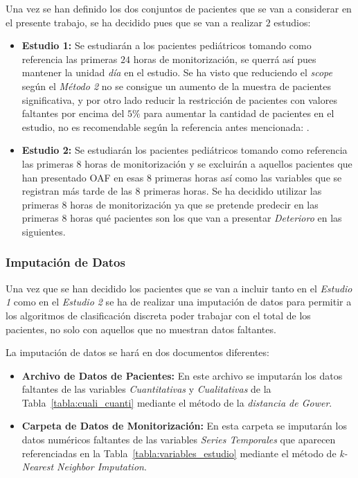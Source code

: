 Una vez se han definido los dos conjuntos de pacientes que se van a considerar en el presente trabajo, se ha decidido pues que se van a realizar $2$ estudios:

\begin{itemize}
    \item \textbf{Estudio 1:} Se estudiarán a los pacientes pediátricos tomando como referencia las primeras $24$ horas de monitorización, se querrá así pues mantener la unidad \textit{día} en el estudio. Se ha visto que reduciendo el \textit{scope} según el \textit{Método 2} no se consigue un aumento de la muestra de pacientes significativa, y por otro lado reducir la restricción de pacientes con valores faltantes por encima del $5\%$ para aumentar la cantidad de pacientes en el estudio, no es recomendable según la referencia antes mencionada: \cite{Scheffer2002}.
    \item \textbf{Estudio 2:} Se estudiarán los pacientes pediátricos tomando como referencia las primeras $8$ horas de monitorización y se excluirán a aquellos pacientes que han presentado OAF en esas 8 primeras horas así como las variables que se registran más tarde de las $8$ primeras horas. Se ha decidido utilizar las primeras $8$ horas de monitorización ya que se pretende predecir en las primeras $8$ horas qué pacientes son los que van a presentar \textit{Deterioro} en las siguientes.
\end{itemize}

\newpage
\subsubsection{Imputación de Datos}\label{sec:imputacion-de-datos}

Una vez que se han decidido los pacientes que se van a incluir tanto en el \textit{Estudio 1} como en el \textit{Estudio 2} se ha de realizar una imputación de datos para permitir a los algoritmos de clasificación discreta poder trabajar con el total de los pacientes, no solo con aquellos que no muestran datos faltantes. 

La imputación de datos se hará en dos documentos diferentes:
\begin{itemize}
    \item \textbf{Archivo de Datos de Pacientes:} En este archivo se imputarán los datos faltantes de las variables \textit{Cuantitativas} y \textit{Cualitativas} de la Tabla~\ref{tabla:cuali_cuanti} mediante el método de la \textit{distancia de Gower}.
    \item \textbf{Carpeta de Datos de Monitorización:} En esta carpeta se imputarán los datos numéricos faltantes de las variables \textit{Series Temporales} que aparecen referenciadas en la Tabla~\ref{tabla:variables_estudio} mediante el método de \textit{k-Nearest Neighbor Imputation}.
\end{itemize}

